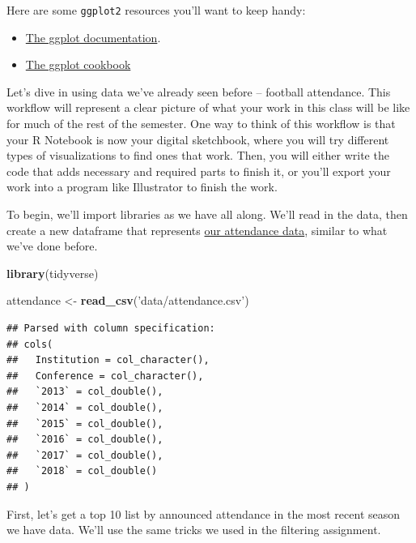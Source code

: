 \documentclass[
]{book}
\newenvironment{Shaded}{\begin{snugshade}}{\end{snugshade}}
\newcommand{\KeywordTok}[1]{\textcolor[rgb]{0.13,0.29,0.53}{\textbf{#1}}}
\newcommand{\NormalTok}[1]{#1}
\newcommand{\StringTok}[1]{\textcolor[rgb]{0.31,0.60,0.02}{#1}}
\providecommand{\tightlist}{%
  \setlength{\itemsep}{0pt}\setlength{\parskip}{0pt}}
\begin{document}
Here are some \texttt{ggplot2} resources you'll want to keep handy:

\begin{itemize}
\tightlist
\item
  \href{http://ggplot2.tidyverse.org/reference/index.html}{The ggplot documentation}.
\item
  \href{http://www.cookbook-r.com/Graphs/}{The ggplot cookbook}
\end{itemize}

Let's dive in using data we've already seen before -- football attendance. This workflow will represent a clear picture of what your work in this class will be like for much of the rest of the semester. One way to think of this workflow is that your R Notebook is now your digital sketchbook, where you will try different types of visualizations to find ones that work. Then, you will either write the code that adds necessary and required parts to finish it, or you'll export your work into a program like Illustrator to finish the work.

To begin, we'll import libraries as we have all along. We'll read in the data, then create a new dataframe that represents \href{https://unl.box.com/s/oajabnn5614s22jstgcd9ojxo2njn6jt}{our attendance data}, similar to what we've done before.

\begin{Shaded}
\begin{Highlighting}[]
\KeywordTok{library}\NormalTok{(tidyverse)}
\end{Highlighting}
\end{Shaded}

\begin{Shaded}
\begin{Highlighting}[]
\NormalTok{attendance <-}\StringTok{ }\KeywordTok{read_csv}\NormalTok{(}\StringTok{'data/attendance.csv'}\NormalTok{)}
\end{Highlighting}
\end{Shaded}

\begin{verbatim}
## Parsed with column specification:
## cols(
##   Institution = col_character(),
##   Conference = col_character(),
##   `2013` = col_double(),
##   `2014` = col_double(),
##   `2015` = col_double(),
##   `2016` = col_double(),
##   `2017` = col_double(),
##   `2018` = col_double()
## )
\end{verbatim}

First, let's get a top 10 list by announced attendance in the most recent season we have data. We'll use the same tricks we used in the filtering assignment.
\end{document}
